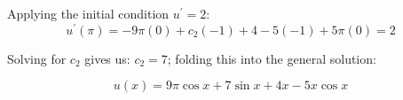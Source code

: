\vspace{0.25cm}

\noindent Applying the initial condition $u^{\prime}=2$:
\begin{equation*}
u^{\prime}(\pi)=-9\pi(0)+c_2(-1)+4-5(-1)+5\pi(0)=2
\end{equation*}

\vspace{0.25cm}

\noindent Solving for $c_2$ gives us: $c_2 = 7$; folding this into the general solution:

\begin{equation*}
u(x) = 9\pi \cos{x}+7\sin{x}+4x-5x\cos{x}
\end{equation*}

